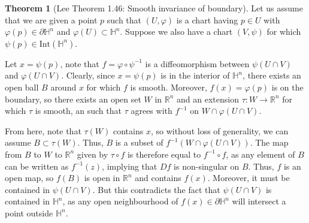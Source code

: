 \documentclass[aps,pra,showpacs,notitlepage,onecolumn,superscriptaddress,nofootinbib]{revtex4-1}
\theoremstyle{definition}
\newtheorem{theorem}{Theorem}[section]
\begin{document}
  \begin{theorem}[Lee Theorem 1.46: Smooth invariance of boundary]
    Let us assume that we are given a point $p$ such that $(U, \varphi)$ is a chart having $p \in U$ with $\varphi(p) \in \partial \mathbb{H}^{n}$ and $\varphi(U) \subset \mathbb{H}^{n}$. Suppose
    we also have a chart $(V, \psi)$ for which $\psi(p) \in \text{Int}(\mathbb{H}^{n})$.

    Let $x = \psi(p)$, note that $f = \varphi \circ \psi^{-1}$ is a diffeomorphism between $\psi(U \cap V)$ and $\varphi(U \cap V)$. Clearly, since $x = \psi(p)$ is in the interior of $\mathbb{H}^{n}$, there
    exists an open ball $B$ around $x$ for which $f$ is smooth. Moreover, $f(x) = \varphi(p)$ is on the boundary, so there exists an open set $W$ in $\mathbb{R}^{n}$ and an extension $\tau : W \rightarrow \mathbb{R}^{n}$
    for which $\tau$ is smooth, an such that $\tau$ agrees with $f^{-1}$ on $W \cap \varphi(U \cap V)$.

    From here, note that $\tau(W)$ contains $x$, so without loss of generality, we can assume $B \subset \tau(W)$. Thus, $B$ is a subset of $f^{-1}(W \cap \varphi(U \cap V))$.
    The map from $B$ to $W$ to $\mathbb{R}^{n}$ given by $\tau \circ f$ is therefore equal to $f^{-1} \circ f$, as any element of $B$ can be written as $f^{-1}(z)$, implying that $Df$
    is non-singular on $B$. Thus, $f$ is an open map, so $f(B)$ is open in $\mathbb{R}^{n}$ and contains $f(x)$. Moreover, it must be contained in $\psi(U \cap V)$. But this contradicts the fact that
    $\psi(U \cap V)$ is contained in $\mathbb{H}^{n}$, as any open neighbourhood of $f(x) \in \partial \mathbb{H}^{n}$ will intersect a point outside $\mathbb{H}^{n}$.
    \end{theorem}

\end{document}
